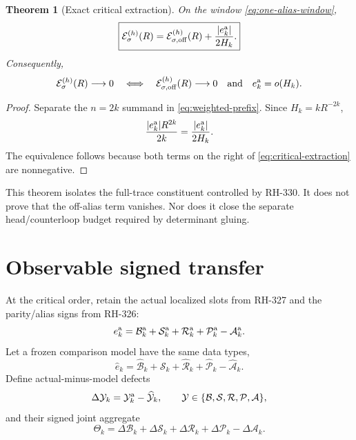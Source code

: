 \documentclass[11pt]{article}
\newtheorem{theorem}{Theorem}[section]
\theoremstyle{remark}
\newcommand{\cA}{\mathcal A}
\newcommand{\cB}{\mathcal B}
\newcommand{\cE}{\mathcal E}
\newcommand{\cP}{\mathcal P}
\newcommand{\cR}{\mathcal R}
\newcommand{\cS}{\mathcal S}
\newcommand{\cY}{\mathcal Y}
\newcommand{\wh}[1]{\widehat{#1}}
\begin{document}
\begin{theorem}[Exact critical extraction]
\label{thm:critical-extraction}
On the window \eqref{eq:one-alias-window},
\begin{equation}
 \boxed{
 \cE_\sigma^{(h)}(R)
 =\cE_{\sigma,\mathrm{off}}^{(h)}(R)
  +\frac{|e_k^{\rm a}|}{2H_k}.}
 \label{eq:critical-extraction}
\end{equation}
Consequently,
\begin{equation}
 \cE_\sigma^{(h)}(R)\longrightarrow0
 \quad\Longleftrightarrow\quad
 \cE_{\sigma,\mathrm{off}}^{(h)}(R)\longrightarrow0
 \quad\text{and}\quad
 e_k^{\rm a}=o(H_k).
 \label{eq:prefix-equivalence}
\end{equation}
\end{theorem}

\begin{proof}
Separate the $n=2k$ summand in \eqref{eq:weighted-prefix}.  Since
$H_k=kR^{-2k}$,
\[
 \frac{|e_k^{\rm a}|R^{2k}}{2k}
 =\frac{|e_k^{\rm a}|}{2H_k}.
\]
The equivalence follows because both terms on the right of
\eqref{eq:critical-extraction} are nonnegative.
\end{proof}

This theorem isolates the full-trace constituent controlled by RH-330.  It
does not prove that the off-alias term vanishes.  Nor does it close the
separate head/counterloop budget required by determinant gluing.

\section{Observable signed transfer}

At the critical order, retain the actual localized slots from RH-327 and the
parity/alias signs from RH-326:
\begin{equation}
 e_k^{\rm a}
 =\cB_k^{\rm a}+\cS_k^{\rm a}+\cR_k^{\rm a}
  +\cP_k^{\rm a}-\cA_k^{\rm a}.
 \label{eq:actual-ledger}
\end{equation}
Let a frozen comparison model have the same data types,
\begin{equation}
 \wh e_k
 =\wh\cB_k+\wh\cS_k+\wh\cR_k+\wh\cP_k-\wh\cA_k.
 \label{eq:model-ledger}
\end{equation}
Define actual-minus-model defects
\begin{equation}
 \Delta\cY_k=\cY_k^{\rm a}-\wh\cY_k,
 \qquad
 \cY\in\{\cB,\cS,\cR,\cP,\cA\},
 \label{eq:slot-defects}
\end{equation}
and their signed joint aggregate
\begin{equation}
 \Theta_k
 =\Delta\cB_k+\Delta\cS_k+\Delta\cR_k
  +\Delta\cP_k-\Delta\cA_k.
 \label{eq:joint-defect}
\end{equation}
\end{document}
